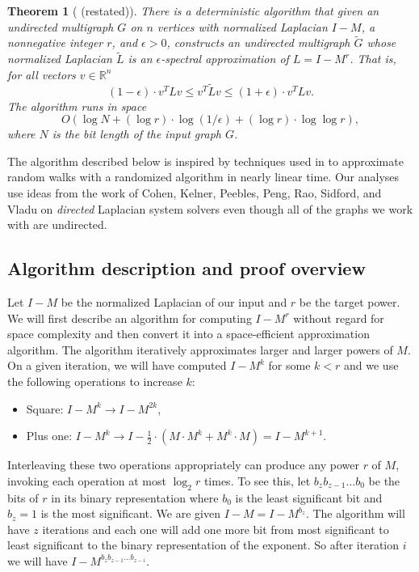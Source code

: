 \documentclass{toc}
\newcommand{\wt}{\widetilde}   %
\newcommand{\SC}{O(\log N + (\log r)\cdot\log(1/\epsilon)+(\log r)\cdot \log\log r)}
\numberwithin{myalgctr}{section}
\theoremstyle{named}
\newtheorem{namedtheorem}{Theorem}[section]
\begin{document}
\begin{namedtheorem}[ (restated)]
There is a deterministic algorithm that given an undirected multigraph $G$ on $n$ vertices with normalized Laplacian $I-M$, a nonnegative integer $r$, and $\epsilon>0$, constructs an undirected multigraph $\wt{G}$ whose normalized Laplacian $\wt{L}$ is an $\epsilon$-spectral approximation of $L=I-M^r$. That is, for all vectors $v\in\mathbb{R}^n$
\[
(1-\epsilon)\cdot v^{T}Lv \leq v^{T}\wt{L}v \leq (1+\epsilon)\cdot v^{T}Lv.
\]
The algorithm runs in space
\[
  \SC,
\]
where $N$ is the bit length of the input graph $G$.
\end{namedtheorem}

The algorithm described below is inspired by techniques used in \cite{cheng2015} to approximate random walks with a randomized algorithm in nearly linear time. Our analyses use ideas from the work of Cohen, Kelner, Peebles, Peng, Rao, Sidford, and Vladu on \emph{directed} Laplacian system solvers even though all of the graphs we work with are undirected.
%
\subsection{Algorithm description and proof overview}
\label{sect:description}
Let $I-M$ be the normalized Laplacian of our input and $r$ be the target power. We will first describe an algorithm for computing $I-M^r$ without regard for space complexity and then convert it into a space-efficient approximation algorithm. The algorithm iteratively approximates larger and larger powers of $M$. On a given iteration, we will have computed $I-M^k$ for some $k<r$ and we use the following operations to increase $k$:
\begin{itemize}
\item Square: $I-M^k \rightarrow I-M^{2k}$,
\item Plus one: $I-M^{k} \rightarrow I-\frac{1}{2}\cdot (M\cdot M^{k}+ M^{k}\cdot M) = I-M^{k+1}$.
\end{itemize}

Interleaving these two operations appropriately can produce any power $r$ of $M$, invoking each operation at most $\log_2 r$ times. To see this, let $b_zb_{z-1}\ldots b_0$ be the bits of $r$ in its binary representation where $b_0$ is the least significant bit and $b_{z}=1$ is the most significant. We are given $I-M=I-M^{b_z}$. The algorithm will have $z$ iterations and each one will add one more bit from most significant to least significant to the binary representation of the exponent. So after iteration $i$ we will have $I-M^{b_zb_{z-1}\ldots b_{z-i}}$.
\end{document}
